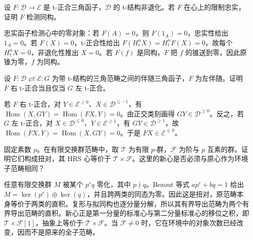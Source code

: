 \begin{exercise}\label{b4:ex:19-faithful-heart-conservative}
	设 \(F:\mathcal D\to\mathcal E\) 是 t-正合三角函子，\(\mathcal D\) 的 t-结构非退化。若 \(F\) 在心上的限制忠实，证明 \(F\) 检测同构。
\end{exercise}
\begin{solution}
	忠实函子检测心中的零对象：若 \(F(A)=0\)，则 \(F(1_A)=0\)，忠实性给出 \(1_A=0\)。若 \(F(X)=0\)，t-正合性给出 \(F(H_t^nX)=H_t^nF(X)=0\)，故每个 \(H_t^nX=0\)，非退化性推出 \(X=0\)。若 \(F(f)\) 是同构，\(F\) 把 \(f\) 的锥送到零，因此原锥为零，\(f\) 为同构。
\end{solution}

\begin{exercise}\label{b4:ex:19-t-exact-adjoints}
	设 \(F:\mathcal D\rightleftarrows\mathcal E:G\) 为带 t-结构的三角范畴之间的伴随三角函子，\(F\) 为左伴随。证明 \(F\) 右 t-正合当且仅当 \(G\) 左 t-正合。
\end{exercise}
\begin{solution}
	若 \(F\) 右 t-正合，对 \(Y\in\mathcal E^{\ge0}\)、\(X\in\mathcal D^{\le-1}\)，有 \(\operatorname{Hom}(X,GY)=\operatorname{Hom}(FX,Y)=0\)。由正交类刻画得 \(GY\in\mathcal D^{\ge0}\)。反之，若 \(G\) 左 t-正合，对 \(X\in\mathcal D^{\le0}\)、\(Y\in\mathcal E^{\ge1}\)，有 \(GY\in\mathcal D^{\ge1}\)，故 \(\operatorname{Hom}(FX,Y)=\operatorname{Hom}(X,GY)=0\)。于是 \(FX\in\mathcal E^{\le0}\)。
\end{solution}

\begin{exercise}\label{b4:ex:19-finite-primary-tilt}
	固定素数 \(p\)。在有限交换群范畴中，取 \(\mathcal T\) 为有限 \(p\)-群，\(\mathcal F\) 为阶与 \(p\) 互素的群。证明它们构成扭对，其 HRS 心等价于 \(\mathcal T\times\mathcal F\)。这里的新心是否必须与原心作为环境子范畴相同？
\end{exercise}
\begin{solution}
	任意有限交换群 \(M\) 被某个 \(p^rq\) 零化，其中 \(p\nmid q\)。Bezout 等式 \(ap^r+bq=1\) 给出 \(M=\ker(p^r)\oplus\ker(q)\)，并且跨两类的同态为零。因此这是扭对，原范畴本身等价于两类的直积。复形与拟同构也逐分量分解，所以其有界导出范畴为两个有界导出范畴的直积。新心正是第一分量的标准心与第二分量标准心的移位之积，即 \(\mathcal T\times\mathcal F[1]\)，抽象上等价于 \(\mathcal T\times\mathcal F\)。当 \(\mathcal F\ne0\) 时，它在环境中的对象次数已经改变，因而不是原来的全子范畴。
\end{solution}

